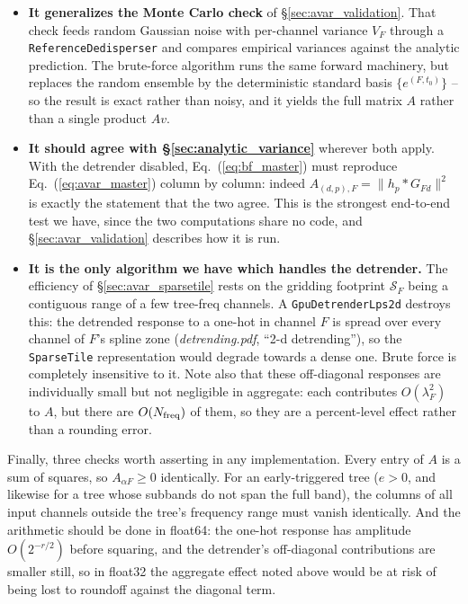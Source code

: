 \documentclass{article}
\numberwithin{equation}{section}   %
\newcommand{\dtnotes}[1]{{\em detrending.pdf}, ``#1''}
\begin{document}
\begin{itemize}

\item {\bf It generalizes the Monte Carlo check} of \S\ref{sec:avar_validation}. That check feeds
random Gaussian noise with per-channel variance $V_F$ through a {\tt ReferenceDedisperser} and
compares empirical variances against the analytic prediction. The brute-force algorithm runs the
same forward machinery, but replaces the random ensemble by the deterministic standard basis
$\{e^{(F,t_0)}\}$ -- so the result is exact rather than noisy, and it yields the full matrix $A$
rather than a single product $Av$.

\item {\bf It should agree with \S\ref{sec:analytic_variance}} wherever both apply. With the
detrender disabled, Eq.\ (\ref{eq:bf_master}) must reproduce Eq.\ (\ref{eq:avar_master}) column
by column: indeed $A_{(d,p),F} = \|h_p * G_{Fd}\|^2$ is exactly the statement that the two agree.
This is the strongest end-to-end test we have, since the two computations share no code, and
\S\ref{sec:avar_validation} describes how it is run.

\item {\bf It is the only algorithm we have which handles the detrender.} The efficiency of
\S\ref{sec:avar_sparsetile} rests on the gridding footprint ${\mathcal S}_F$ being a contiguous
range of a few tree-freq channels. A {\tt GpuDetrenderLps2d} destroys this: the detrended response to a
one-hot in channel $F$ is spread over every channel of $F$'s spline zone (\dtnotes{2-d detrending}),
so the {\tt SparseTile} representation would degrade towards a dense one. Brute force is completely
insensitive to it. Note also that these off-diagonal responses are individually small but not
negligible in aggregate: each contributes $O(\lambda_F^2)$ to $A$, but there are $O(N_{\rm freq})$
of them, so they are a percent-level effect rather than a rounding error.

\end{itemize}
\par\noindent
Finally, three checks worth asserting in any implementation. Every entry of $A$ is a sum of
squares, so $A_{\alpha F} \ge 0$ identically. For an early-triggered tree ($e>0$, and likewise for
a tree whose subbands do not span the full band), the columns of all input channels outside the
tree's frequency range must vanish identically. And the arithmetic should be done in float64: the
one-hot response has amplitude $O(2^{-r/2})$ before squaring, and the detrender's off-diagonal
contributions are smaller still, so in float32 the aggregate effect noted above would be at risk of
being lost to roundoff against the diagonal term.
\end{document}
